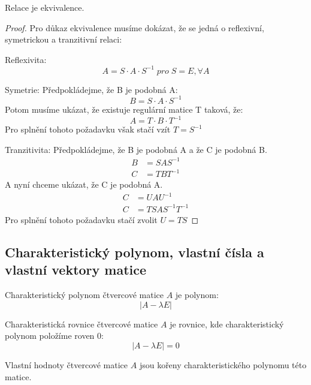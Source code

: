 \begin{theorem}
    Relace  je ekvivalence.
\end{theorem}
\begin{proof}
    Pro důkaz ekvivalence musíme dokázat, že se jedná o reflexivní, symetrickou a tranzitivní
    relaci:

    Reflexivita:
    $$A = S\cdot A\cdot S^{-1}\; pro\; S=E,  \forall A$$

    Symetrie: Předpokládejme, že B je podobná A:
    $$B = S\cdot A \cdot S^{-1}$$
    Potom musíme ukázat, že existuje regulární matice T taková, že:
    $$A = T \cdot B \cdot T^{-1}$$
    Pro splnění tohoto požadavku však stačí vzít $T = S^{-1}$

    Tranzitivita:
    Předpokládejme, že B je podobná A a že C je podobná B.
    \begin{align*}
        B &= SAS^{-1}\\
        C &= TBT^{-1}
    \end{align*}
    A nyní chceme ukázat, že C je podobná A.
    \begin{align*}
        C &= UAU^{-1}\\
        C &= TSAS^{-1}T^{-1}
    \end{align*}
    Pro splnění tohoto požadavku stačí zvolit $U = TS$
\end{proof}

\subsection{Charakteristický polynom, vlastní čísla a vlastní vektory matice}
\begin{definition}
    Charakteristický polynom čtvercové matice $A$ je polynom:
    $$|A - \lambda E|$$
\end{definition}

\begin{definition}
    Charakteristická rovnice čtvercové matice $A$ je rovnice, kde charakteristický polynom
    položíme roven 0:
    $$|A - \lambda E| = 0$$
\end{definition}

\begin{definition}
    Vlastní hodnoty čtvercové matice $A$ jsou kořeny charakteristického polynomu této matice.
\end{definition}

